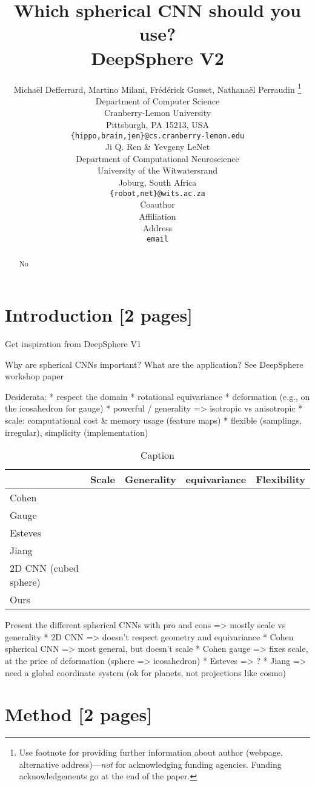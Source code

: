 \documentclass{article} %
\title{Which spherical CNN should you use?\\ DeepSphere V2}
\author{Michaël Defferrard, Martino Milani, Frédérick Gusset,  Nathanaël Perraudin \thanks{ Use footnote for providing further information about author (webpage, alternative address)---\emph{not} for acknowledging
funding agencies.  Funding acknowledgements go at the end of the paper.} \\
Department of Computer Science\\
Cranberry-Lemon University\\
Pittsburgh, PA 15213, USA \\
\texttt{\{hippo,brain,jen\}@cs.cranberry-lemon.edu} \\
\And
Ji Q. Ren \& Yevgeny LeNet \\
Department of Computational Neuroscience \\
University of the Witwatersrand \\
Joburg, South Africa \\
\texttt{\{robot,net\}@wits.ac.za} \\
\AND
Coauthor \\
Affiliation \\
Address \\
\texttt{email}
}
\begin{document}
\maketitle

\begin{abstract}
No
\end{abstract}

\section{Introduction [2 pages]}
Get inspiration from DeepSphere V1

Why are spherical CNNs important? What are the application?
See DeepSphere workshop paper

Desiderata:
* respect the domain
  * rotational equivariance
  * deformation (e.g., on the icosahedron for gauge)
* powerful / generality => isotropic vs anisotropic
* scale: computational cost \& memory usage (feature maps)
* flexible (samplings, irregular), simplicity (implementation)

\begin{table}[h!]
    \centering
    \begin{tabular}{l|c|c|c|c}
         & Scale & Generality& equivariance & Flexibility \\
         \hline
        Cohen & & & &  \\
         \hline
        Gauge & & & &  \\
         \hline
        Esteves & & & &  \\
         \hline
        Jiang & & & &  \\
         \hline
        2D CNN (cubed sphere) & & & &  \\
         \hline
        Ours & & & &  \\
    \end{tabular}
    \caption{Caption}
    \label{tab:my_label}
\end{table}

Present the different spherical CNNs with pro and cons => mostly scale vs generality
* 2D CNN => doesn't respect geometry and equivariance
* Cohen spherical CNN => most general, but doesn't scale
* Cohen gauge => fixes scale, at the price of deformation (sphere => icosahedron)
* Esteves => ?
* Jiang => need a global coordinate system (ok for planets, not projections like cosmo)

\cite{perraudin2019deepsphere}

\section{Method [2 pages]}
\end{document}
